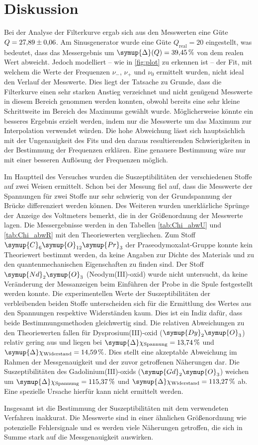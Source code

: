\section{Diskussion}
\label{sec:Diskussion}
Bei der Analyse der Filterkurve ergab sich aus den Messwerten eine Güte $Q = \num{27.89 +- 0.06}{}$. Am Sinusgenerator wurde eine Güte $Q_\text{real} = 20$
eingestellt, was bedeutet, dass das Messergebnis um $\symup{\Delta}(Q) = \qty{39.45}{\percent}$ von dem realen Wert abweicht. Jedoch modelliert -- wie in 
\autoref{fig:plot} zu erkennen ist -- der Fit, mit welchem die Werte der Frequenzen $\nu_-$, $\nu_+$ und $\nu_0$ ermittelt wurden, nicht ideal den Verlauf
der Messwerte. Dies liegt der Tatsache zu Grunde, dass die Filterkurve einen sehr starken Anstieg verzeichnet und nicht genügend Messwerte in diesem Bereich
genommen werden konnten, obwohl bereits eine sehr kleine Schrittweite im Bereich des Maximums gewählt wurde. Möglicherweise könnte ein besseres Ergebnis erzielt 
werden, indem nur die Messwerte um das Maximum zur Interpolation verwendet würden. Die hohe Abweichung lässt sich hauptsächlich mit der Ungenauigkeit des Fits und 
den daraus resultierenden Schwierigkeiten in der Bestimmung der Frequenzen erklären. Eine genauere Bestimmung wäre nur mit einer besseren Auflösung 
der Frequenzen möglich.

Im Hauptteil des Versuches wurden die Suszeptibilitäten der verschiedenen Stoffe auf zwei Weisen ermittelt. Schon bei der Messung fiel auf, dass die Messwerte
der Spannungen für zwei Stoffe nur sehr schwierig von der Grundspannung der Brücke differenziert werden können. Des Weiteren wurden unerklärliche Sprünge der
Anzeige des Voltmeters bemerkt, die in der Größenordnung der Messwerte lagen. Die Messergebnisse werden in den Tabellen \ref{tab:Chi_abwU} und \ref{tab:Chi_abwR}
mit den Theoriewerten vergliechen. Zum Stoff $\symup{C}_6\symup{O}_{12}\symup{Pr}_3$ der Praseodymoxalat-Gruppe konnte kein Theoriewert bestimmt werden, da
keine Angaben zur Dichte des Materials und zu den quantenmechanischen Eigenschaften zu finden sind. Der Stoff $\symup{Nd}_2\symup{O}_3$ (Neodym(III)-oxid)
wurde nicht untersucht, da keine Veränderung der Messanzeigen beim Einführen der Probe in die Spule festgestellt werden konnte. Die experimentellen Werte
der Suszeptibilitäten der verbleibenden beiden Stoffe unterscheiden sich für die Ermittlung des Wertes aus den Spannungen respektive Widerständen kaum.
Dies ist ein Indiz dafür, dass beide Bestimmungsmethoden gleichwertig sind. Die relativen Abweichungen zu den Theoriewerten fallen für Dysprosium(III)-oxid
($\symup{Dy}_2\symup{O}_3$) relativ gering aus und liegen bei $\symup{\Delta}\chi_\text{Spannung} = \qty{13.74}{\percent}$ und
$\symup{\Delta}\chi_\text{Widerstand} = \qty{14.59}{\percent}$. Dies stellt eine akzeptable Abweichung im Rahmen der Messgenauigkeit und der zuvor getroffenen 
Näherungen dar. Die Suszeptibilitäten des Gadolinium(III)-oxids ($\symup{Gd}_2\symup{O}_3$) weichen um $\symup{\Delta}\chi_\text{Spannung} = \qty{115.37}{\percent}$
und $\symup{\Delta}\chi_\text{Widerstand} = \qty{113.27}{\percent}$ ab. Eine spezielle Ursache hierfür kann nicht ermittelt werden. 

Insgesamt ist die Bestimmung der Suszeptibilitäten mit dem verwendeten Verfahren inakkurat. Die Messwerte sind in einer ähnlichen Größenordnung wie potenzielle
Fehlersignale und es werden viele Näherungen getroffen, die sich in Summe stark auf die Messgenauigkeit auswirken. 
